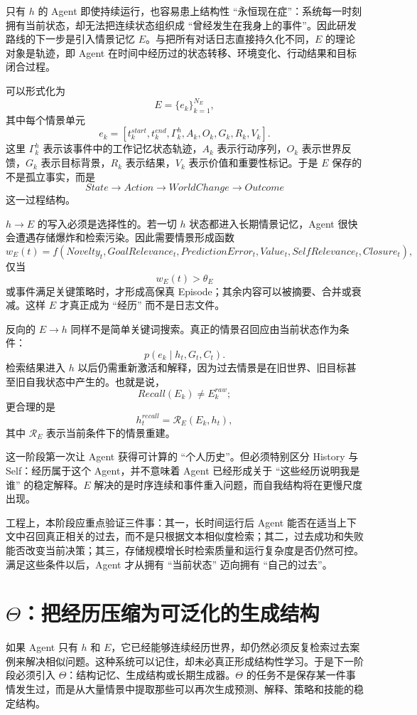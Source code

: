 只有 $h$ 的 Agent 即使持续运行，也容易患上结构性 ``永恒现在症''：系统每一时刻拥有当前状态，却无法把连续状态组织成 ``曾经发生在我身上的事件''。因此研发路线的下一步是引入情景记忆 $E$。与把所有对话日志直接持久化不同，$E$ 的理论对象是轨迹，即 Agent 在时间中经历过的状态转移、环境变化、行动结果和目标闭合过程。

可以形式化为
\[
E
=
\{
e_k
\}_{k=1}^{N_E},
\]
其中每个情景单元
\[
e_k
=
\left[
t_k^{start},
t_k^{end},
\Gamma_k^{h},
A_k,
O_k,
G_k,
R_k,
V_k
\right].
\]
这里 $\Gamma_k^{h}$ 表示该事件中的工作记忆状态轨迹，$A_k$ 表示行动序列，$O_k$ 表示世界反馈，$G_k$ 表示目标背景，$R_k$ 表示结果，$V_k$ 表示价值和重要性标记。于是 $E$ 保存的不是孤立事实，而是
\[
State
\rightarrow
Action
\rightarrow
WorldChange
\rightarrow
Outcome
\]
这一过程结构。

$h\rightarrow E$ 的写入必须是选择性的。若一切 $h$ 状态都进入长期情景记忆，Agent 很快会遭遇存储爆炸和检索污染。因此需要情景形成函数
\[
w_E(t)
=
f(
Novelty_t,
GoalRelevance_t,
PredictionError_t,
Value_t,
SelfRelevance_t,
Closure_t
),
\]
仅当
\[
w_E(t)>\theta_E
\]
或事件满足关键策略时，才形成高保真 Episode；其余内容可以被摘要、合并或衰减。这样 $E$ 才真正成为 ``经历'' 而不是日志文件。

反向的 $E\rightarrow h$ 同样不是简单关键词搜索。真正的情景召回应由当前状态作为条件：
\[
p(e_k\mid h_t,G_t,C_t).
\]
检索结果进入 $h$ 以后仍需重新激活和解释，因为过去情景是在旧世界、旧目标甚至旧自我状态中产生的。也就是说，
\[
Recall(E_k)\neq E_k^{raw};
\]
更合理的是
\[
h_t^{recall}
=
\mathcal R_E(E_k,h_t),
\]
其中 $\mathcal R_E$ 表示当前条件下的情景重建。

这一阶段第一次让 Agent 获得可计算的 ``个人历史''。但必须特别区分 History 与 Self：经历属于这个 Agent，并不意味着 Agent 已经形成关于 ``这些经历说明我是谁'' 的稳定解释。$E$ 解决的是时序连续和事件重入问题，而自我结构将在更慢尺度出现。

工程上，本阶段应重点验证三件事：其一，长时间运行后 Agent 能否在适当上下文中召回真正相关的过去，而不是只根据文本相似度检索；其二，过去成功和失败能否改变当前决策；其三，存储规模增长时检索质量和运行复杂度是否仍然可控。满足这些条件以后，Agent 才从拥有 ``当前状态'' 迈向拥有 ``自己的过去''。

\section{$\Theta$：把经历压缩为可泛化的生成结构}

如果 Agent 只有 $h$ 和 $E$，它已经能够连续经历世界，却仍然必须反复检索过去案例来解决相似问题。这种系统可以记住，却未必真正形成结构性学习。于是下一阶段必须引入 $\Theta$：结构记忆、生成结构或长期生成器。$\Theta$ 的任务不是保存某一件事情发生过，而是从大量情景中提取那些可以再次生成预测、解释、策略和技能的稳定结构。

